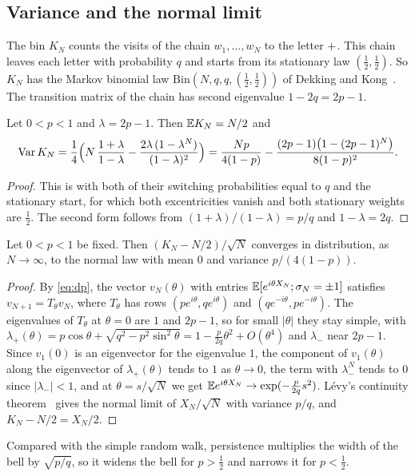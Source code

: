 \subsection{Variance and the normal limit}\label{sec:clt}

The bin $K_N$ counts the visits of the chain $w_1,\dots,w_N$ to the letter
$\mathord{+}$. This chain leaves each letter with probability $q$ and starts from its
stationary law $(\frac12,\frac12)$. So $K_N$ has the Markov binomial law
$\mathrm{Bin}(N,q,q,(\frac12,\frac12))$ of Dekking and
Kong~\cite{dekkingkong2011}. The transition matrix of the chain has second
eigenvalue $1-2q=2p-1$.

\begin{proposition}\label{prop:var}
Let $0<p<1$ and $\lambda=2p-1$. Then $\mathbb{E} K_N=N/2$ and
\[
\operatorname{Var} K_N=\frac14\Bigl(N\,\frac{1+\lambda}{1-\lambda}-\frac{2\lambda\,(1-\lambda^N)}{(1-\lambda)^2}\Bigr)
=\frac{Np}{4(1-p)}-\frac{(2p-1)\bigl(1-(2p-1)^N\bigr)}{8(1-p)^2}.
\]
\end{proposition}

\begin{proof}
This is \cite[Eq.~(2.3) and Proposition~2.1]{dekkingkong2011} with both of
their switching probabilities equal to $q$
and the stationary start, for which both excentricities vanish and both
stationary weights are $\frac12$. The second form follows from
$(1+\lambda)/(1-\lambda)=p/q$ and $1-\lambda=2q$.
\end{proof}

\begin{theorem}\label{thm:clt}
Let $0<p<1$ be fixed. Then $(K_N-N/2)/\sqrt N$ converges in distribution, as
$N\to\infty$, to the normal law with mean $0$ and variance $p/(4(1-p))$.
\end{theorem}

\begin{proof}
By \eqref{eq:dp}, the vector $v_N(\theta)$ with entries
$\mathbb{E}[e^{i\theta X_N};\sigma_N=\pm1]$ satisfies $v_{N+1}=T_\theta v_N$, where $T_\theta$ has rows
$(pe^{i\theta},qe^{i\theta})$ and $(qe^{-i\theta},pe^{-i\theta})$. The
eigenvalues of $T_\theta$ at $\theta=0$ are $1$ and $2p-1$, so for small $|\theta|$ they
stay simple, with
$\lambda_+(\theta)=p\cos\theta+\sqrt{q^2-p^2\sin^2\theta}=1-\frac p{2q}\theta^2+O(\theta^4)$
and $\lambda_-$ near $2p-1$. Since $v_1(0)$ is an eigenvector for the
eigenvalue $1$, the component of $v_1(\theta)$ along the eigenvector of
$\lambda_+(\theta)$ tends to $1$ as $\theta\to0$, the term with $\lambda_-^N$ tends
to $0$ since $|\lambda_-|<1$, and at
$\theta=s/\sqrt N$ we get $\mathbb{E} e^{i\theta X_N}\to\exp(-\frac p{2q}s^2)$. L\'evy's
continuity theorem~\cite[Theorem~26.3]{billingsley1995} gives the normal
limit of $X_N/\sqrt N$ with variance $p/q$, and $K_N-N/2=X_N/2$.
\end{proof}

Compared with the simple random walk, persistence multiplies the width of the
bell by $\sqrt{p/q}$, so it widens the bell for $p>\frac12$ and narrows it for
$p<\frac12$.

